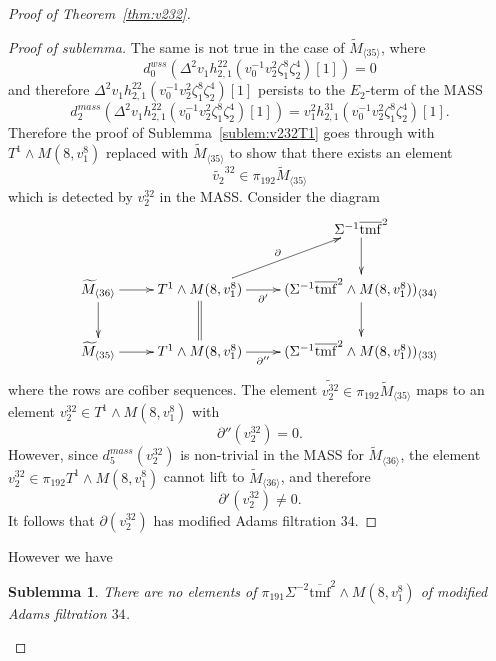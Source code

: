 \documentclass[10pt]{amsart}
\newcommand{\bra}[1]{\langle #1 \rangle}
\newcommand{\br}[1]{\overline{#1}}
\newcommand{\td}[1]{\widetilde{#1}}
\newcommand{\tmf}{\mathrm{tmf}}
\newtheorem{sublem}[equation]{Sublemma}
\theoremstyle{definition}
\numberwithin{equation}{section}
\numberwithin{figure}{section}
\begin{document}
\begin{proof}[Proof of Theorem~\ref{thm:v232}]
\begin{description}
\begin{proof}[Proof of sublemma]
The same is not true in the case of $\td{M}_{\bra{35}}$, where 
$$ d^{wss}_0(\Delta^2 v_1 h_{2,1}^{22}(v_0^{-1}v_2^2\zeta_1^8\zeta_2^4)[1])
= 0 $$
and therefore $\Delta^2 v_1 h_{2,1}^{22}(v_0^{-1}v_2^2\zeta_1^8\zeta_2^4)[1]$ persists to the $E_2$-term of the MASS
$$ d^{mass}_2(\Delta^2 v_1 h_{2,1}^{22}(v_0^{-1}v_2^2\zeta_1^8\zeta_2^4)[1]) = 
v_1^2 h_{2,1}^{31}(v_0^{-1}v_2^2\zeta_1^8\zeta_2^4)[1]. $$
Therefore the proof of Sublemma~\ref{sublem:v232T1} goes through with $T^1 \wedge M(8,v_1^8)$ replaced with $\td{M}_{\bra{35}}$ to show that there exists an element 
$$ \td{v_2}^{32} \in \pi_{192}\td{M}_{\bra{35}} $$
which is detected by $v_2^{32}$ in the MASS.
Consider the diagram
$$
\xymatrix{
& & \Sigma^{-1} \br{\tmf}^2 \ar[d] \\
\td{M}_{\bra{36}} \ar[d] \ar[r] & 
T^1 \wedge M(8,v_1^8) \ar[r]_-{\partial'} \ar[ru]^{\partial} \ar@{=}[d] & 
(\Sigma^{-1} \br{\tmf}^2 \wedge M(8,v_1^8))_{\bra{34}} \ar[d] \\
\td{M}_{\bra{35}} \ar[r] & 
T^1 \wedge M(8,v_1^8) \ar[r]_-{\partial''} &
(\Sigma^{-1} \br{\tmf}^2 \wedge M(8,v_1^8))_{\bra{33}} 
}
$$
where the rows are cofiber sequences.
The element $\td{v_2^{32}} \in \pi_{192}\td{M}_{\bra{35}}$ maps to an element
$v_2^{32} \in T^1 \wedge M(8,v_1^8)$ with
$$ \partial''(v_2^{32}) = 0. $$
However, since $d_5^{mass}(v_2^{32})$ is non-trivial in the MASS for $\td{M}_{\bra{36}}$, the element $v_2^{32} \in \pi_{192}T^1 \wedge M(8,v_1^8)$ cannot lift to $\td{M}_{\bra{36}}$, and therefore
$$ \partial'(v_2^{32}) \ne 0. $$
It follows that $\partial(v_2^{32})$ has modified Adams filtration $34$.  
\end{proof}

However we have

\begin{sublem}
There are no elements of $\pi_{191}\Sigma^{-2}\br{\tmf}^2 \wedge M(8,v_1^8)$ of modified Adams filtration $34$.
\end{sublem}


\end{description}
\end{proof}
\end{document}
